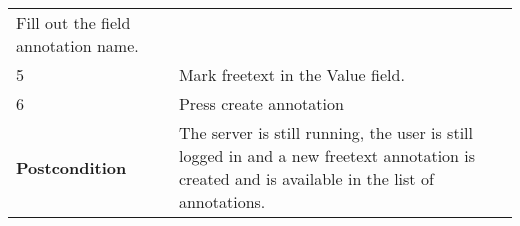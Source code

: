 \begin{longtable}[c]{@{}ll@{}}
\begin{minipage}[t]{0.63\columnwidth}\raggedright\strut
Fill out the field annotation name.
\strut\end{minipage}\tabularnewline
\begin{minipage}[t]{0.31\columnwidth}\raggedright\strut
5
\strut\end{minipage} &
\begin{minipage}[t]{0.63\columnwidth}\raggedright\strut
Mark freetext in the Value field.
\strut\end{minipage}\tabularnewline
\begin{minipage}[t]{0.31\columnwidth}\raggedright\strut
6
\strut\end{minipage} &
\begin{minipage}[t]{0.63\columnwidth}\raggedright\strut
Press create annotation
\strut\end{minipage}\tabularnewline
\begin{minipage}[t]{0.31\columnwidth}\raggedright\strut
\textbf{Postcondition}
\strut\end{minipage} &
\begin{minipage}[t]{0.63\columnwidth}\raggedright\strut
The server is still running, the user is still logged in and a new
freetext annotation is created and is available in the list of
annotations.
\strut\end{minipage}\tabularnewline
\bottomrule
\end{longtable}

